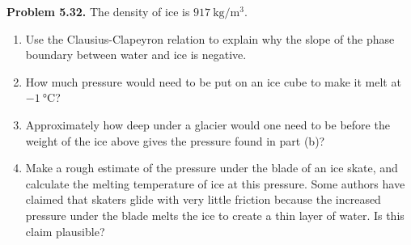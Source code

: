 \documentclass[a4paper, 12pt]{config/homework}
\begin{document}
\pagebreak\noindent
\textbf{Problem 5.32.} The density of ice is \(\qty{917}{\kg\per\meter\cubed}\).
\begin{enumerate}[label=\textbf{(\alph*)}]
\item Use the Clausius-Clapeyron relation to explain why the slope of the phase boundary between water and ice is negative.
\item How much pressure would need to be put on an ice cube to make it melt at \(\qty{-1}{\celsius}\)?
\item Approximately how deep under a glacier would one need to be before the weight of the ice above gives the pressure found in part (b)?
\item Make a rough estimate of the pressure under the blade of an ice skate, and calculate the melting temperature of ice at this pressure. Some authors have claimed that skaters glide with very little friction because the increased pressure under the blade melts the ice to create a thin layer of water. Is this claim plausible?
\end{enumerate}
\end{document}

